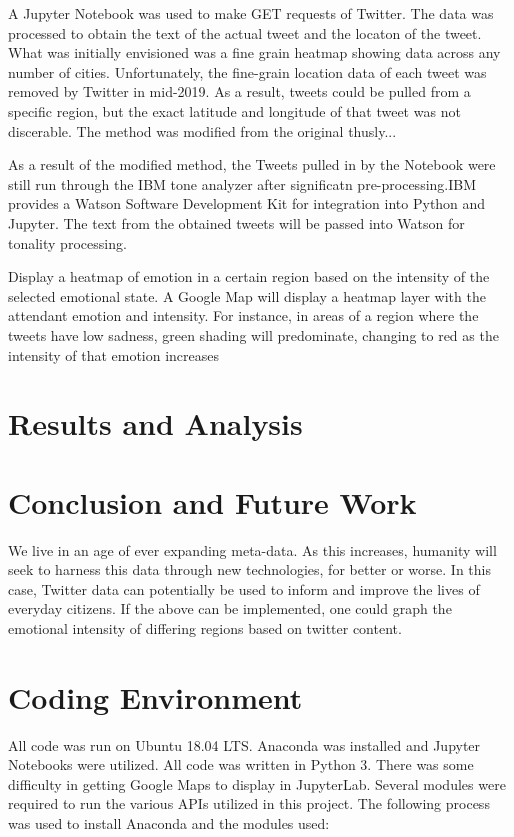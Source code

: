 \documentclass[12pt, oneside]{article}
\begin{document}
 A Jupyter Notebook was used to make GET requests of Twitter. The
 data was processed to obtain the text of the actual tweet and the locaton of
 the tweet. What was initially envisioned was a fine grain heatmap showing data
 across any number of cities. Unfortunately, the fine-grain location data of
 each tweet was removed by Twitter in mid-2019. As a result, tweets could be
 pulled from a specific region, but the exact latitude and longitude of that
 tweet was not discerable. The method was modified from the original thusly...


 As a result of the modified method, the Tweets pulled in by the Notebook were
 still run through the IBM tone analyzer after significatn pre-processing.IBM provides a Watson Software
 Development Kit for integration into Python and Jupyter. The text from the
 obtained tweets will be passed into Watson for tonality processing.

 Display a heatmap of emotion in a certain region based on the intensity
 of the selected emotional state. A Google
 Map will display a heatmap layer with the attendant emotion and intensity. For
 instance, in areas of a region where the tweets have low sadness, green shading
 will predominate, changing to red as the intensity of that emotion increases


\section{Results and Analysis}


\section{Conclusion and Future Work}
We live in an age of ever expanding meta-data. As this increases, humanity will
seek to harness this data through new technologies, for better or worse. In
this case, Twitter data can potentially be used to inform and improve the lives
of everyday citizens. If the above can be implemented, one could graph
the emotional intensity of differing regions based on twitter content.

\newpage{}


%


\newpage{}
\appendix{}
\section{Coding Environment}
All code was run on Ubuntu 18.04 LTS. Anaconda was installed and Jupyter
Notebooks were utilized. All code was written in Python 3. There was some
difficulty in getting Google Maps to display in JupyterLab. Several modules
were required to run the various APIs utilized in this project. The following process was used to install Anaconda and the modules used:
\end{document}
